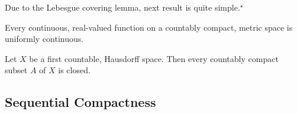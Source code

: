 Due to the Lebesgue covering lemma, next result is quite simple.$^\star$

\begin{theorem}
	Every continuous, real-valued function on a countably compact, metric space is uniformly continuous.
\end{theorem}

\begin{proposition}
	Let $X$ be a first countable, Hausdorff space.
	Then every countably compact subset $A$ of $X$ is closed.\cite[Exercises 11.1.7]{joshi}
\end{proposition}


\subsection{Sequential Compactness}
